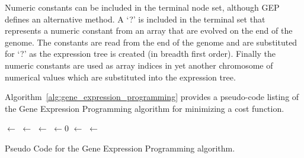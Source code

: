 \documentclass[a4paper, 11pt]{article}
\begin{document}
Numeric constants can be included in the terminal node set, although GEP defines an alternative method. A `?' is included in the terminal set that represents a numeric constant from an array that are evolved on the end of the genome. The constants are read from the end of the genome and are substituted for `?' as the expression tree is created (in breadth first order). Finally the numeric constants are used as array indices in yet another chromosome of numerical values which are substituted into the expression tree.

Algorithm~\ref{alg:gene_expression_programming} provides a pseudo-code listing of the Gene Expression Programming algorithm for minimizing a cost function. 

\begin{algorithm}[htp]
	\SetLine  

  
	\KwIn{\PopulationSize, \ProblemSize, \ProbabilityCrossover, \ProbabilityMutate}		
	\KwOut{\Best}
	\Population $\leftarrow$ \InitializePopulation{\PopulationSize, \ProblemSize}\;
	\EvaluatePopulation{\Population}\;
	\Best $\leftarrow$ \GetBestSolution{\Population}\;
	\While{$\neg$\StopCondition{}} {
		\Parents $\leftarrow$ \SelectParents{\Population, \PopulationSize}\;
		\Children $\leftarrow 0$\;
		\ForEach{\ParentOne, \ParentTwo $\in$ \Parents}{
			\ChildOne, \ChildTwo $\leftarrow$ \Crossover{\ParentOne, \ParentTwo, \ProbabilityCrossover}\;
			\Children $\leftarrow$ \Mutate{\ChildOne, \ProbabilityMutate}\;
			\Children $\leftarrow$ \Mutate{\ChildTwo, \ProbabilityMutate}\;
		}
		\EvaluatePopulation{\Children}\;
		\Best $\leftarrow$ \GetBestSolution{\Children}\;
		\Population $\leftarrow$ \Replace{\Population, \Children}\;
	}
	\Return{\Best}\;
	\caption{Pseudo Code for the Gene Expression Programming algorithm.}
	\label{alg:gene_expression_programming}
\end{algorithm}
\end{document}
